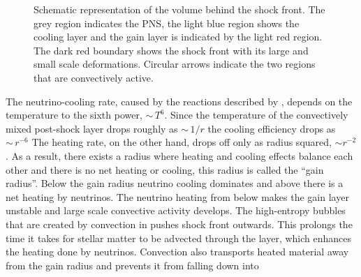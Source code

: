 \begin{figure}
\begin{center}
\end{center}
\caption{Schematic representation of the volume behind the shock front. The grey region indicates the PNS, the light blue
region shows the cooling layer and the gain layer is indicated by the light red region. The dark red boundary shows the shock
front with its large and small scale deformations. Circular arrows indicate the two regions that are convectively active. }
\label{figSN:post}
\end{figure}
The neutrino-cooling rate, caused by the reactions described by , depends on the temperature to the sixth power, $\sim \, T^6$. 
Since the temperature of the convectively mixed 
post-shock layer drops roughly as $\sim \, 1/r$ \citep{janka_12} the cooling efficiency drops as $\sim \, r^{-6}$  
The heating rate, on the other hand, drops off only as radius squared, $\sim r^{-2}$.     
As a result, there exists a radius where heating and cooling effects balance each other and there is no net
heating or cooling, this radius is called the ``gain radius''. Below the gain radius neutrino cooling dominates
and above there is a net heating by neutrinos. The neutrino heating from below makes the gain layer unstable and
large scale convective activity develops. The high-entropy bubbles that are created by convection in
pushes shock front outwards. This prolongs the time it takes for stellar matter to be advected through the layer, which enhances the heating done by neutrinos. 
Convection also transports heated material away from the gain radius and prevents it from falling down into
